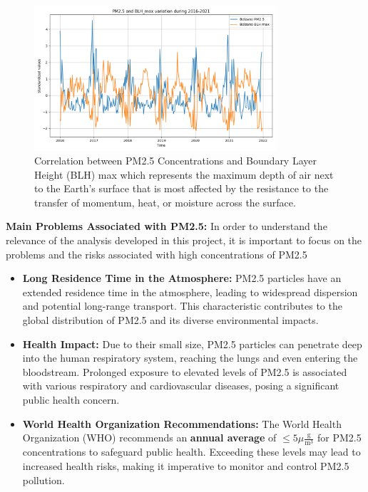 \documentclass[12pt,a4paper]{article}
\begin{document}
\begin{figure}[h]
    \centering
    \includegraphics[width=0.8\textwidth]{./imgs/maps/plot_Bolzano_PM25_BLHmax_years.png}
    \caption{Correlation between PM2.5 Concentrations and Boundary Layer Height (BLH) max
     which represents the maximum depth of air next to the Earth’s surface that is most affected by the
    resistance to the transfer of momentum, heat, or moisture across the surface.}
    \label{fig:pm_blh_correlation}
\end{figure} 
\textbf{Main Problems Associated with PM2.5:}
In order to understand the relevance of the analysis developed in this project, it is important to focus on the problems and the risks associated with high concentrations of PM2.5
\begin{itemize}
    \item \textbf{Long Residence Time in the Atmosphere:} PM2.5 particles have an extended residence time in the atmosphere, leading to widespread dispersion and potential long-range transport. This characteristic contributes to the global distribution of PM2.5 and its diverse environmental impacts.

    \item \textbf{Health Impact:} Due to their small size, PM2.5 particles can penetrate deep into the human respiratory system, reaching the lungs and even entering the bloodstream. Prolonged exposure to elevated levels of PM2.5 is associated with various respiratory and cardiovascular diseases, posing a significant public health concern.

    \item \textbf{World Health Organization Recommendations:} The World Health Organization (WHO) recommends an \textbf{annual average} of $\leq 5\mu \frac{\mathrm{g}}{\mathrm{m}^3}$ for PM2.5 concentrations to safeguard public health. Exceeding these levels may lead to increased health risks, making it imperative to monitor and control PM2.5 pollution.
\end{itemize}
\end{document}
